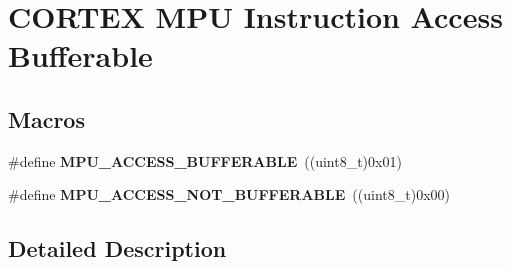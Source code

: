 \hypertarget{group___c_o_r_t_e_x___m_p_u___access___bufferable}{}\section{C\+O\+R\+T\+EX M\+PU Instruction Access Bufferable}
\label{group___c_o_r_t_e_x___m_p_u___access___bufferable}
\subsection*{Macros}
\begin{DoxyCompactItemize}
\item 
\#define {\bfseries M\+P\+U\+\_\+\+A\+C\+C\+E\+S\+S\+\_\+\+B\+U\+F\+F\+E\+R\+A\+B\+LE}~((uint8\+\_\+t)0x01)\hypertarget{group___c_o_r_t_e_x___m_p_u___access___bufferable_ga8a5b35395db1facf4aa07acbfe80ec2e}{}\label{group___c_o_r_t_e_x___m_p_u___access___bufferable_ga8a5b35395db1facf4aa07acbfe80ec2e}

\item 
\#define {\bfseries M\+P\+U\+\_\+\+A\+C\+C\+E\+S\+S\+\_\+\+N\+O\+T\+\_\+\+B\+U\+F\+F\+E\+R\+A\+B\+LE}~((uint8\+\_\+t)0x00)\hypertarget{group___c_o_r_t_e_x___m_p_u___access___bufferable_ga0ffcf769775a11854c4980f6badc1a35}{}\label{group___c_o_r_t_e_x___m_p_u___access___bufferable_ga0ffcf769775a11854c4980f6badc1a35}

\end{DoxyCompactItemize}


\subsection{Detailed Description}

